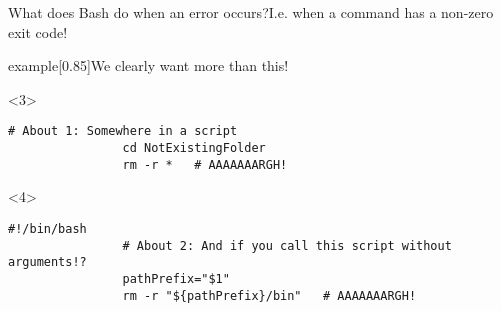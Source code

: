 \begin{frame}[fragile]{What does Bash do when an error occurs?}{I.e. when a command has a non-zero exit code!}
\begin{overlayarea}{\textwidth}{0.7\textheight}
\begin{varblock}{example}[0.85\textwidth]{We clearly want more than this!}
        \end{varblock}
        \begin{onlyenv}<3>
            \begin{lstlisting}[style=myBash, numbers=none, aboveskip=3mm]
                # About 1: Somewhere in a script
                cd NotExistingFolder
                rm -r *   # AAAAAAARGH!
            \end{lstlisting}
        \end{onlyenv}
        \begin{onlyenv}<4>
            \begin{lstlisting}[style=myBash, numbers=none, aboveskip=3mm]
                #!/bin/bash
                # About 2: And if you call this script without arguments!?
                pathPrefix="$1"
                rm -r "${pathPrefix}/bin"   # AAAAAAARGH!
            \end{lstlisting}
        \end{onlyenv}
    \end{overlayarea}
\end{frame}

